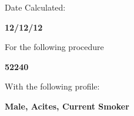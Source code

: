 \documentclass[
  11pt,
  landscape]{article}
\begin{document}
\begin{flushright}
\vspace{-16.5cm} \hspace{18cm} \normalsize Date Calculated:

\vspace{-0.25 cm} \hspace{18cm} \normalsize \textbf{12/12/12}

\vspace{-0.2cm} \hspace{18cm} \normalsize For the following procedure

\vspace{-0.2cm} \hspace{18cm} \small \textbf{52240}

\vspace{-0.2cm} \hspace{18cm} \normalsize With the following profile:

\vspace{-0.2cm} \hspace{18cm} \small \textbf{Male, Acites, Current Smoker}
\end{flushright}
\end{document}
